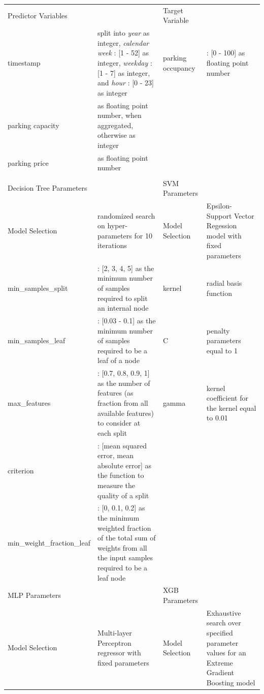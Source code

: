 \documentclass{ws-ijait}
\begin{document}
		\begin{table}
			{\begin{tabular}{lp{4cm}lp{4cm}}	
					\toprule
					Predictor Variables & & Target Variable & \\
					\colrule
					timestamp & split into \textit{year} as integer, \textit{calendar week} : [1 - 52] as integer, \textit{weekday} : [1 - 7] as integer, and \textit{hour} : [0 - 23] as integer & parking occupancy & : [0 - 100] as floating point number \\
					parking capacity & as floating point number, when aggregated, otherwise as integer & & \\
					parking price & as floating point number & & \\
					&  & & \\
					\colrule
					Decision Tree Parameters & & SVM Parameters & \\
					\colrule
					Model Selection & randomized search on hyper-parameters for 10 iterations & Model Selection & Epsilon-Support Vector Regession model with fixed parameters \\
					min\_samples\_split & : [2, 3, 4, 5] as the minimum number of samples required to split an internal node & kernel & radial basis function \\
					min\_samples\_leaf & : [0.03 - 0.1] as the minimum number of samples required to be a leaf of a node & C & penalty parameters equal to 1 \\
					max\_features & : [0.7, 0.8, 0.9, 1] as the number of features (as fraction from all available features) to consider at each split & gamma & kernel coefficient for the kernel equal to 0.01 \\
					criterion & : [mean squared error, mean absolute error] as the function to measure the quality of a split &  &  \\
					min\_weight\_fraction\_leaf & : [0, 0.1, 0.2] as the minimum weighted fraction of the total sum of weights from all the input samples required to be a leaf node & & \\
					\colrule
					MLP Parameters & & XGB Parameters & \\
					\colrule
					Model Selection & Multi-layer Perceptron regressor with fixed parameters & Model Selection & Exhaustive search over specified parameter values for an Extreme Gradient Boosting model \\
					

\end{tabular}}
\end{table}
\end{document}
